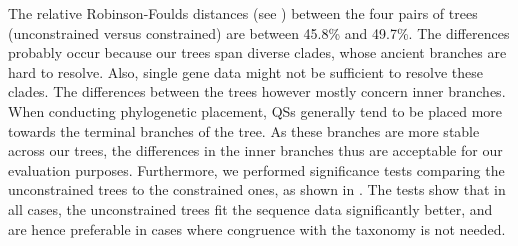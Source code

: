 The relative Robinson-Foulds distances \citep{Robinson1981}
(see )
between the four pairs of trees (unconstrained versus constrained) are between \num{45.8}\% and \num{49.7}\%.
The differences probably occur because our trees span diverse clades,
whose ancient branches are hard to resolve. %
Also, single gene data might not be sufficient to resolve these clades.
%
The differences between the trees however mostly concern inner branches.
When conducting phylogenetic placement,
\acp{QS} generally tend to be placed more towards the terminal branches of the tree.
As these branches are more stable across our trees,
the differences in the inner branches thus are acceptable for our evaluation purposes.
Furthermore, we performed significance tests comparing the unconstrained trees to the constrained ones,
as shown in .
The tests show that in all cases, the unconstrained trees fit the sequence data significantly better,
and are hence preferable in cases where congruence with the taxonomy is not needed.

